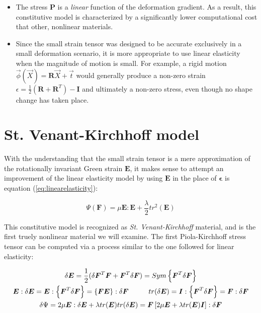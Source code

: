 \begin{itemize}
 \item The stress $\boldsymbol{P}$ is a \textit{linear} function of the deformation gradient. As a result, this constitutive model is characterized by a significantly
lower computational cost that other, nonlinear materials. 

\item Since the small strain tensor was designed to be accurate exclusively in a small deformation scenario, it is more appropriate to use linear elasticity when the magnitude
of motion is small. For example, a rigid motion $\vec{\phi}(\vec{X})=\boldsymbol{R}\vec{X}+\vec{t}$ would generally produce a non-zero strain 
$\epsilon = \frac{1}{2}(\boldsymbol{R}+\boldsymbol{R}^T)-\boldsymbol{I}$ and ultimately a non-zero stress, even though no shape change has taken place. 
\end{itemize}

\section{St. Venant-Kirchhoff model}
With the understanding that the small strain tensor is a mere approximation of the rotationally invariant Green strain $\boldsymbol{E}$, it 
makes sense to attempt an improvement of the linear elasticity model by using $\boldsymbol{E}$ in the place of $\boldsymbol{\epsilon}$ is equation
 (\ref{eq:linearelasticity}):

 \begin{equation}
 \Psi(\mathbf{F}) = \mu\boldsymbol{E}:\boldsymbol{E} + \frac{\lambda}{2}tr^2(\boldsymbol{E})
 \end{equation}

This constitutive model is recognized as \textit{St. Venant-Kirchhoff} material, and is the first truely nonlinear material we will examine. The first
Piola-Kirchhoff stress tensor can be computed via a process similar to the one followed for linear elasticity:

\begin{gather*}
  \delta\boldsymbol{E}=\frac{1}{2} (\delta\boldsymbol{F}^T\boldsymbol{F}+ \boldsymbol{F}^T\delta\boldsymbol{F})=Sym\left\{\boldsymbol{F}^T\delta\boldsymbol{F}\right\}\\
  \boldsymbol{E}:\delta\boldsymbol{E}=\boldsymbol{E}:\left\{\boldsymbol{F}^T\delta\boldsymbol{F}\right\}=\left\{\boldsymbol{FE}\right\}:\delta\boldsymbol{F}
  \hspace{10 mm} tr(\delta\boldsymbol{E})=\boldsymbol{I}:\left\{\boldsymbol{F}^T\delta\boldsymbol{F} \right\}=\boldsymbol{F}:\delta\boldsymbol{F}\\
  \delta\Psi=2\mu\boldsymbol{E}:\delta\boldsymbol{E}+\lambda tr(\boldsymbol{E})tr(\delta\boldsymbol{E})=\boldsymbol{F}\left[2\mu\boldsymbol{E}+\lambda tr(\boldsymbol{E}) \boldsymbol{I} \right]:\delta\boldsymbol{F}
\end{gather*}


